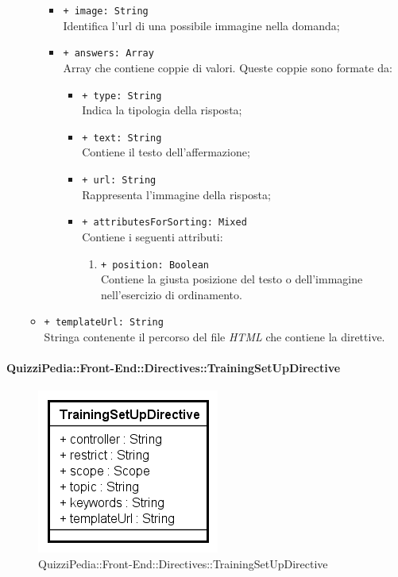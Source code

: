 \begin{itemize}
\begin{itemize}
\begin{itemize}
					\item \texttt{+ image: String} \\ Identifica l'url di una possibile immagine nella domanda;
					\item \texttt{+ answers: Array} \\ Array che contiene coppie di valori. Queste coppie sono formate da:
					\begin{itemize}
						\item \texttt{+ type: String} \\ Indica la tipologia della risposta;
						\item \texttt{+ text: String} \\ Contiene il testo dell'affermazione;
						\item \texttt{+ url: String} \\ Rappresenta l'immagine della risposta;
						\item \texttt{+ attributesForSorting: Mixed} \\ Contiene i seguenti attributi:
						\begin{enumerate}
							\item \texttt{+ position: Boolean} \\ Contiene la giusta posizione del testo o dell'immagine nell'esercizio di ordinamento.
						\end{enumerate}
					\end{itemize}
				\end{itemize}
				\item \texttt{+ templateUrl: String} \\ Stringa contenente il percorso del file \textit{HTML} che contiene la direttive.
			\end{itemize}
		\end{itemize}
		
		\paragraph{QuizziPedia::Front-End::Directives::TrainingSetUpDirective}
		
		\label{QuizziPedia::Front-End::Directives::TrainingSetUpDirective}
		
		\begin{figure}[ht]
			\centering
			\includegraphics[scale=0.80,keepaspectratio]{UML/Classi/Front-End/QuizziPedia_Front-end_Templates_TrainingSetUpTemplate.png}
			\caption{QuizziPedia::Front-End::Directives::TrainingSetUpDirective}
		\end{figure} \FloatBarrier
		
